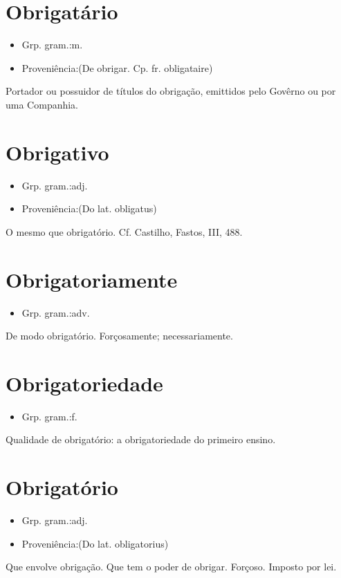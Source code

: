 \section{Obrigatário}
\begin{itemize}
\item {Grp. gram.:m.}
\end{itemize}
\begin{itemize}
\item {Proveniência:(De \textunderscore obrigar\textunderscore . Cp. fr. \textunderscore obligataire\textunderscore )}
\end{itemize}
Portador ou possuidor de títulos do obrigação, emittidos pelo Govêrno ou por uma Companhia.
\section{Obrigativo}
\begin{itemize}
\item {Grp. gram.:adj.}
\end{itemize}
\begin{itemize}
\item {Proveniência:(Do lat. \textunderscore obligatus\textunderscore )}
\end{itemize}
O mesmo que \textunderscore obrigatório\textunderscore . Cf. Castilho, \textunderscore Fastos\textunderscore , III, 488.
\section{Obrigatoriamente}
\begin{itemize}
\item {Grp. gram.:adv.}
\end{itemize}
De modo obrigatório.
Forçosamente; necessariamente.
\section{Obrigatoriedade}
\begin{itemize}
\item {Grp. gram.:f.}
\end{itemize}
Qualidade de obrigatório: \textunderscore a obrigatoriedade do primeiro ensino\textunderscore .
\section{Obrigatório}
\begin{itemize}
\item {Grp. gram.:adj.}
\end{itemize}
\begin{itemize}
\item {Proveniência:(Do lat. \textunderscore obligatorius\textunderscore )}
\end{itemize}
Que envolve obrigação.
Que tem o poder de obrigar.
Forçoso.
Imposto por lei.
